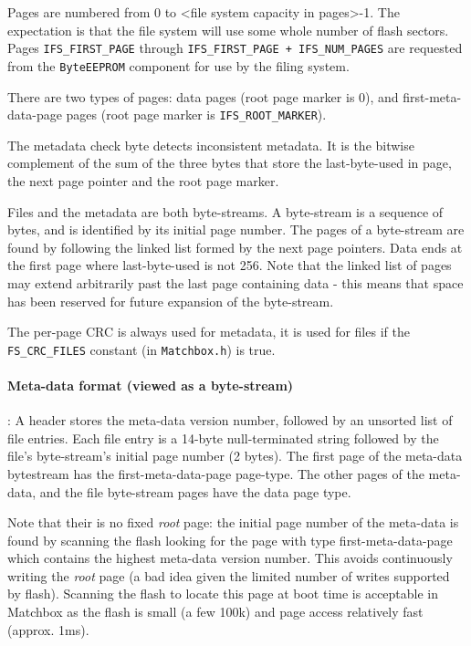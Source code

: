 \documentclass{article}
\newcommand{\kw}[1]{\mbox{\tt #1}}
\newcommand{\file}[1]{\mbox{\tt #1}}
\begin{document}
Pages are numbered from 0 to <file system capacity in pages>-1. The
expectation is that the file system will use some whole number of flash
sectors. Pages \kw{IFS\_FIRST\_PAGE} through \kw{IFS\_FIRST\_PAGE +
IFS\_NUM\_PAGES} are requested from the \kw{ByteEEPROM} component for
use by the filing system.

There are two types of pages: data pages (root page marker is 0), and
first-meta-data-page pages (root page marker is \kw{IFS\_ROOT\_MARKER}).

The metadata check byte detects inconsistent metadata. It is the bitwise
complement of the sum of the three bytes that store the last-byte-used in
page, the next page pointer and the root page marker.

Files and the metadata are both byte-streams. A byte-stream is a sequence
of bytes, and is identified by its initial page number. The pages of a
byte-stream are found by following the linked list formed by the next page
pointers. Data ends at the first page where last-byte-used is not 256. Note
that the linked list of pages may extend arbitrarily past the last page
containing data - this means that space has been reserved for future
expansion of the byte-stream.

The per-page CRC is always used for metadata, it is used for files if the
\kw{FS\_CRC\_FILES} constant (in \file{Matchbox.h}) is true.

\paragraph{Meta-data format (viewed as a byte-stream)}:
A header stores the meta-data version number, followed by an unsorted list
of file entries. Each file entry is a 14-byte null-terminated string
followed by the file's byte-stream's initial page number (2 bytes). The
first page of the meta-data bytestream has the first-meta-data-page
page-type. The other pages of the meta-data, and the file byte-stream pages
have the data page type.

Note that their is no fixed \emph{root} page: the initial page number of the
meta-data is found by scanning the flash looking for the page with type
first-meta-data-page which contains the highest meta-data version number.
This avoids continuously writing the \emph{root} page (a bad idea given the 
limited number of writes supported by flash). Scanning the flash to locate
this page at boot time is acceptable in Matchbox as the flash is small
(a few 100k) and page access relatively fast (approx. 1ms). 
\end{document}
